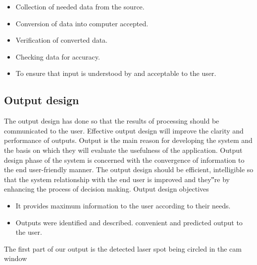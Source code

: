 \begin{itemize}
\item Collection of needed data from the source.
\item Conversion of data into computer accepted.
\item Verification of converted data.
\item Checking data for accuracy.
\item To ensure that input is understood by and acceptable to the user.
\end{itemize}

\subsection*{Output design}
The output design has done so that the results of processing should be communicated to the user. Effective output design will improve the clarity and performance of outputs. Output is the main reason for developing the system and the basis on which they will evaluate the usefulness of the application.
\newline
Output design phase of the system is concerned with the convergence of information to the end user-friendly manner. The output design should be efficient, intelligible so that the system relationship with the end user is improved and they‟re by enhancing the process of decision making.
Output design objectives

\begin{itemize}
\item It provides maximum information to the user according to their needs.
\item Outputs were identified and described.
 \itemProvides convenient and predicted output to the user.
\end{itemize}
The first part of our output is the detected laser spot being circled in the cam window
